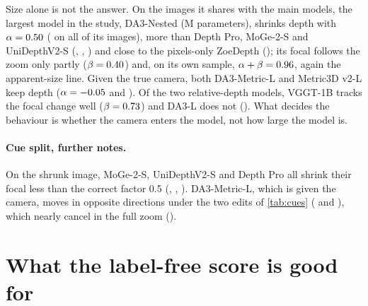 \documentclass[10pt,twocolumn,letterpaper]{article}
\begin{document}
Size alone is not the answer. On the \nSmallShared{} images it shares with the main models, the largest
model in the study, DA3-Nested (\DaThreeNestedParams M parameters), shrinks depth with
$\alpha=0.50$ (\DaThreeNestedAlpha{} on all \DaThreeNestedCamImages{} of its images), more than Depth Pro, MoGe-2-S and UniDepthV2-S
(\DepthproAlphaSmallShared, \MogeTwoSAlphaSmallShared, \UnidepthTwoSAlphaSmallShared) and close to the
pixels-only ZoeDepth (\ZoedepthAlphaSmallShared); its focal follows the zoom only partly
($\beta=0.40$) and, on its own sample, $\alpha+\beta=0.96$, again the
apparent-size line. Given the true camera, both DA3-Metric-L and Metric3D v2-L keep depth
($\alpha=-0.05$ and \MetricThreedLAlphaSmallShared). Of the two relative-depth
models, VGGT-1B tracks the focal change well ($\beta=0.73$) and DA3-L does not
(\DaThreeLBetaSmallShared). What decides the behaviour is whether the camera enters the model, not how
large the model is.



\paragraph{Cue split, further notes.} On the shrunk image, MoGe-2-S, UniDepthV2-S and Depth Pro all shrink their
focal less than the correct factor 0.5 (\MogeTwoSCueShrinkFocal, \UnidepthTwoSCueShrinkFocal,
\DepthproCueShrinkFocal). DA3-Metric-L, which is given the camera, moves in opposite directions under the two
edits of \cref{tab:cues} (\DaThreeMetricLCueContext{} and \DaThreeMetricLCueMagnify), which nearly cancel in the
full zoom (\DaThreeMetricLCueZoom).

\section{What the label-free score is good for}\label{sec:supp_label}
\end{document}
